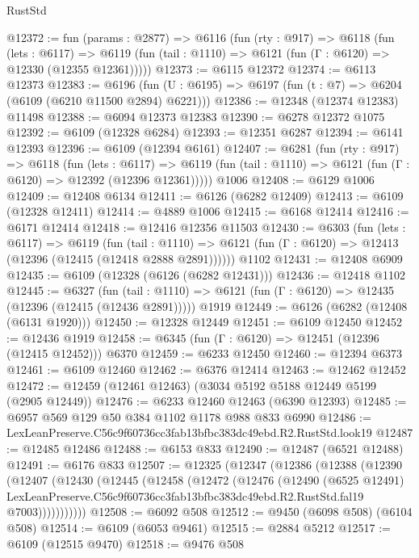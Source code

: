 \begin{lexlean}{RustStd}
\begin{coremodule}
@12372 := fun (params : @2877) =>
  @6116
    (fun (rty : @917) =>
    @6118
      (fun (lets : @6117) =>
      @6119 (fun (tail : @1110) => @6121 (fun (Γ : @6120) => @12330 (@12355 @12361)))))
@12373 := @6115 @12372
@12374 := @6113 @12373
@12383 := @6196
    (fun (U : @6195) => @6197 (fun (t : @7) => @6204 (@6109 (@6210 @11500 @2894) @6221)))
@12386 := @12348 (@12374 @12383) @11498
@12388 := @6094 @12373 @12383
@12390 := @6278 @12372 @1075
@12392 := @6109 (@12328 @6284)
@12393 := @12351 @6287
@12394 := @6141 @12393
@12396 := @6109 (@12394 @6161)
@12407 := @6281
    (fun (rty : @917) =>
    @6118
      (fun (lets : @6117) =>
      @6119 (fun (tail : @1110) => @6121 (fun (Γ : @6120) => @12392 (@12396 @12361)))))
    @1006
@12408 := @6129 @1006
@12409 := @12408 @6134
@12411 := @6126 (@6282 @12409)
@12413 := @6109 (@12328 @12411)
@12414 := @4889 @1006
@12415 := @6168 @12414
@12416 := @6171 @12414
@12418 := @12416 @12356 @11503
@12430 := @6303
    (fun (lets : @6117) =>
    @6119
      (fun (tail : @1110) =>
      @6121 (fun (Γ : @6120) => @12413 (@12396 (@12415 (@12418 @2888 @2891))))))
    @1102
@12431 := @12408 @6909
@12435 := @6109 (@12328 (@6126 (@6282 @12431)))
@12436 := @12418 @1102
@12445 := @6327
    (fun (tail : @1110) => @6121 (fun (Γ : @6120) => @12435 (@12396 (@12415 (@12436 @2891)))))
    @1919
@12449 := @6126 (@6282 (@12408 (@6131 @1920)))
@12450 := @12328 @12449
@12451 := @6109 @12450
@12452 := @12436 @1919
@12458 := @6345 (fun (Γ : @6120) => @12451 (@12396 (@12415 @12452))) @6370
@12459 := @6233 @12450
@12460 := @12394 @6373
@12461 := @6109 @12460
@12462 := @6376 @12414
@12463 := @12462 @12452
@12472 := @12459 (@12461 @12463) (@3034 @5192 @5188 @12449 @5199 (@2905 @12449))
@12476 := @6233 @12460 @12463 (@6390 @12393)
@12485 := @6957 @569 @129 @50 @384 @1102 @1178 @988 @833 @6990
@12486 := LexLeanPreserve.C56c9f60736cc3fab13bfbc383dc49ebd.R2.RustStd.look19
@12487 := @12485 @12486
@12488 := @6153 @833
@12490 := @12487 (@6521 @12488)
@12491 := @6176 @833
@12507 := @12325
    (@12347
      (@12386
        (@12388
          (@12390
            (@12407
              (@12430
                (@12445
                  (@12458
                    (@12472
                      (@12476
                        (@12490
                          (@6525 @12491)
                          LexLeanPreserve.C56c9f60736cc3fab13bfbc383dc49ebd.R2.RustStd.fal19
                          @7003)))))))))))
@12508 := @6092 @508
@12512 := @9450 (@6098 @508) (@6104 @508)
@12514 := @6109 (@6053 @9461)
@12515 := @2884 @5212
@12517 := @6109 (@12515 @9470)
@12518 := @9476 @508

\end{coremodule}
\end{lexlean}
